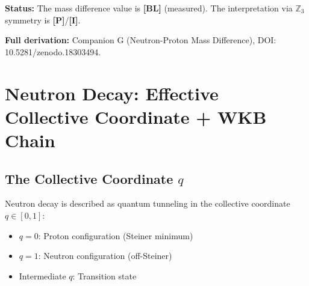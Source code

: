 \documentclass[11pt,a4paper]{article}
\newcommand{\tagP}{\textcolor{red!70!black}{\textbf{[P]}}}
\newcommand{\tagI}{\textcolor{orange!80!black}{\textbf{[I]}}}
\newcommand{\tagBL}{\textcolor{gray!70!black}{\textbf{[BL]}}}
\begin{document}
\textbf{Status:} The mass difference value is \tagBL{} (measured). The interpretation via $\mathbb{Z}_3$ symmetry is \tagP{}/\tagI{}.

\textbf{Full derivation:} Companion G (Neutron-Proton Mass Difference), DOI: 10.5281/zenodo.18303494.

\section{Neutron Decay: Effective Collective Coordinate + WKB Chain}
\label{sec:neutron_decay}

\subsection{The Collective Coordinate $q$}

Neutron decay is described as quantum tunneling in the collective coordinate $q \in [0,1]$:
\begin{itemize}
    \item $q = 0$: Proton configuration (Steiner minimum)
    \item $q = 1$: Neutron configuration (off-Steiner)
    \item Intermediate $q$: Transition state
\end{itemize}

\begin{center}
\end{center}
\end{document}
